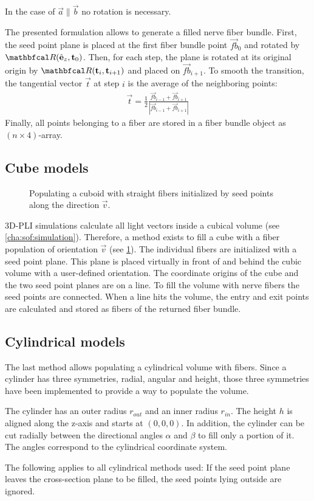 % 
In the case of $\vec{a} \parallel \vec{b}$ no rotation is necessary.
\par
% 
The presented formulation allows to generate a filled nerve fiber bundle.
First, the seed point plane is placed at the first fiber bundle point $\vec{fb}_0$ and rotated by $\mat{R}(\hat{\vec{e}}_z, \vec{t}_0)$.
Then, for each step, the plane is rotated at its original origin by $\mat{R}(\vec{t}_i, \vec{t}_{i+1})$ and placed on $\vec{fb}_{i+1}$.
To smooth the transition, the tangential vector $\vec{t}$ at step $i$ is the average of the neighboring points:
\begin{align}
    \vec{t} = \frac{1}{2} \frac{\vec{fb}_{i-1} + \vec{fb}_{i+1}}{|\vec{fb}_{i-1} + \vec{fb}_{i+1}|}
\end{align}
%
Finally, all points belonging to a fiber are stored in a fiber bundle object as $(n \times 4)$-array.
%
%
%
\subsection{Cube models} \label{sec:cubeModelBuilding}
%
\begin{figure}[!t]
    \centering
    \setlength{\tikzwidth}{0.5\textwidth}
	\caption{Populating a cuboid with straight fibers initialized by seed points along the direction $\vec{v}$.}
    \label{fig:cubeBuild}%
\end{figure}
%
\ac{3D-PLI} simulations calculate all light vectors inside a cubical volume (see \cref{cha:sof:simulation}).
Therefore, a method exists to fill a cube with a fiber population of orientation $\vec{v}$ (see \cref{fig:cubeBuild}).
The individual fibers are initialized with a seed point plane.
This plane is placed virtually in front of and behind the cubic volume with a user-defined orientation.
The coordinate origins of the cube and the two seed point planes are on a line.
To fill the volume with nerve fibers the seed points are connected.
When a line hits the volume, the entry and exit points are calculated and stored as fibers of the returned fiber bundle.
%
%
%
\subsection{Cylindrical models}
%
The last method allows populating a cylindrical volume with fibers.
Since a cylinder has three symmetries, radial, angular and height, those three symmetries have been implemented to provide a way to populate the volume.
\par
%
The cylinder has an outer radius $r_{\mathit{out}}$ and an inner radius $r_{\mathit{in}}$.
The height $h$ is aligned along the z-axis and starts at $(0,0,0)$.
In addition, the cylinder can be cut radially between the directional angles $\alpha$ and $\beta$ to fill only a portion of it.
The angles correspond to the cylindrical coordinate system.
\par
%
The following applies to all cylindrical methods used: If the seed point plane leaves the cross-section plane to be filled, the seed points lying outside are ignored.
%
